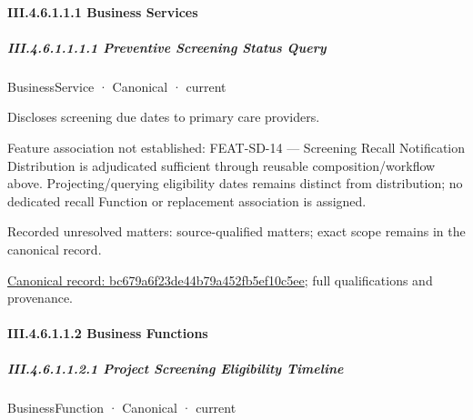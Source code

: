 \paragraph*{III.4.6.1.1.1 Business Services}
\label{navigation:III.4.6.1.1.1}

\subparagraph*{III.4.6.1.1.1.1 Preventive Screening Status Query}
\label{navigation:III.4.6.1.1.1.1}

\label{element:bc679a6f23de44b79a452fb5ef10c5ee}
{\small BusinessService · Canonical · current}\par

Discloses screening due dates to primary care providers.



Feature association not established: FEAT-SD-14 — Screening Recall Notification Distribution is adjudicated sufficient through reusable composition/workflow above. Projecting/querying eligibility dates remains distinct from distribution; no dedicated recall Function or replacement association is assigned.


{\small Recorded unresolved matters: source-qualified matters; exact scope remains in the canonical record.}\par
{\footnotesize \href{../../../../../../../../continuum/business/business-service/bc679a6f23de44b79a452fb5ef10c5ee.md}{Canonical record: bc679a6f23de44b79a452fb5ef10c5ee}; full qualifications and provenance.}\par
\paragraph*{III.4.6.1.1.2 Business Functions}
\label{navigation:III.4.6.1.1.2}

\subparagraph*{III.4.6.1.1.2.1 Project Screening Eligibility Timeline}
\label{navigation:III.4.6.1.1.2.1}

\label{element:afb08bdb99cd41d3a86ef7bf7ad5e92d}
{\small BusinessFunction · Canonical · current}\par


